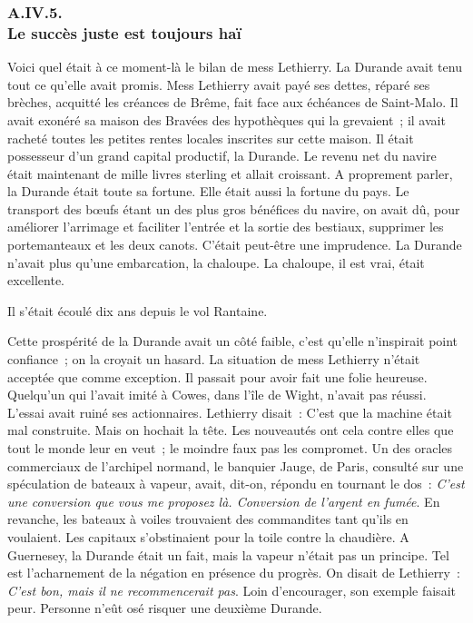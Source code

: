 \documentclass[french,twoside]{book} %
\begin{document}
 \subsubsection[{A.IV.5. Le succès juste est toujours haï}]{A.IV.5. \\
Le succès juste est toujours haï}
\noindent Voici quel était à ce moment-là le bilan de mess Lethierry. La Durande avait tenu tout ce qu’elle avait promis. Mess Lethierry avait payé ses dettes, réparé ses brèches, acquitté les créances de Brême, fait face aux échéances de Saint-Malo. Il avait exonéré sa maison des Bravées des hypothèques qui la grevaient ; il avait racheté toutes les petites rentes locales inscrites sur cette maison. Il était possesseur d’un grand capital productif, la Durande. Le revenu net du navire était maintenant de mille livres sterling et allait croissant. A proprement parler, la Durande était toute sa fortune. Elle était aussi la fortune du pays. Le transport des bœufs étant un des plus gros bénéfices du navire, on avait dû, pour améliorer l’arrimage et faciliter l’entrée et la sortie des bestiaux, supprimer les portemanteaux et les deux canots. C’était peut-être une imprudence. La Durande n’avait plus qu’une embarcation, la chaloupe. La chaloupe, il est vrai, était excellente.\par
 Il s’était écoulé dix ans depuis le vol Rantaine.\par
Cette prospérité de la Durande avait un côté faible, c’est qu’elle n’inspirait point confiance ; on la croyait un hasard. La situation de mess Lethierry n’était acceptée que comme exception. Il passait pour avoir fait une folie heureuse. Quelqu’un qui l’avait imité à Cowes, dans l’île de Wight, n’avait pas réussi. L’essai avait ruiné ses actionnaires. Lethierry disait : C’est que la machine était mal construite. Mais on hochait la tête. Les nouveautés ont cela contre elles que tout le monde leur en veut ; le moindre faux pas les compromet. Un des oracles commerciaux de l’archipel normand, le banquier Jauge, de Paris, consulté sur une spéculation de bateaux à vapeur, avait, dit-on, répondu en tournant le dos : \emph{C’est une conversion que vous me proposez là. Conversion de l’argent en fumée}. En revanche, les bateaux à voiles trouvaient des commandites tant qu’ils en voulaient. Les capitaux s’obstinaient pour la toile contre la chaudière. A Guernesey, la Durande était un fait, mais la vapeur n’était pas un principe. Tel est l’acharnement de la négation en présence du progrès. On disait de Lethierry : \emph{C’est bon, mais il ne recommencerait pas}. Loin d’encourager, son exemple faisait peur. Personne n’eût osé risquer une deuxième Durande.
\end{document}
